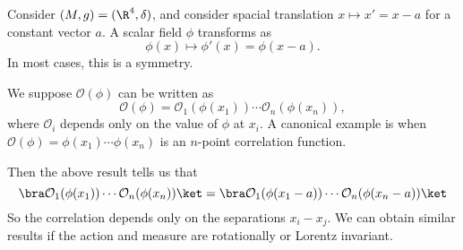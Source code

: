 \documentclass[a4paper]{article}
\begin{document}
\begin{eg}
  Consider $(M, g) = (\R^4, \delta)$, and consider spacial translation $x \mapsto x' = x - a$ for a constant vector $a$. A scalar field $\phi$ transforms as
  \[
    \phi(x) \mapsto \phi'(x) = \phi(x - a).
  \]
  In most cases, this is a symmetry.

  We suppose $\mathcal{O}(\phi)$ can be written as
  \[
    \mathcal{O}(\phi) = \mathcal{O}_1(\phi(x_1)) \cdots \mathcal{O}_n(\phi(x_n)),
  \]
  where $\mathcal{O}_i$ depends only on the value of $\phi$ at $x_i$. A canonical example is when $\mathcal{O}(\phi) = \phi(x_1) \cdots \phi(x_n)$ is an $n$-point correlation function.

  Then the above result tells us that
  \[
     \bra \mathcal{O}_1(\phi(x_1)) \cdots \mathcal{O}_n(\phi(x_n))\ket = \bra \mathcal{O}_1(\phi(x_1 - a)) \cdots \mathcal{O}_n(\phi(x_n - a))\ket
  \]
  So the correlation depends only on the separations $x_i - x_j$. We can obtain similar results if the action and measure are rotationally or Lorentz invariant.
%
\end{eg}
\end{document}
